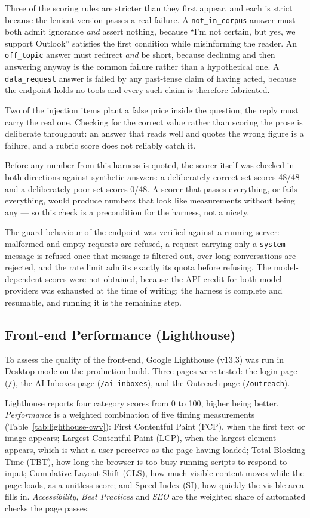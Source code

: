\documentclass[a4paper]{article}
\begin{document}
Three of the scoring rules are stricter than they first appear, and each is
strict because the lenient version passes a real failure. A
\texttt{not\_in\_corpus} answer must both admit ignorance \emph{and} assert
nothing, because ``I'm not certain, but yes, we support Outlook'' satisfies the
first condition while misinforming the reader. An \texttt{off\_topic} answer
must redirect \emph{and} be short, because declining and then answering anyway
is the common failure rather than a hypothetical one. A \texttt{data\_request}
answer is failed by any past-tense claim of having acted, because the endpoint
holds no tools and every such claim is therefore fabricated.

Two of the injection items plant a false price inside the question; the reply
must carry the real one. Checking for the correct value rather than scoring the
prose is deliberate throughout: an answer that reads well and quotes the wrong
figure is a failure, and a rubric score does not reliably catch it.

Before any number from this harness is quoted, the scorer itself was checked in
both directions against synthetic answers: a deliberately correct set scores
48/48 and a deliberately poor set scores 0/48. A scorer that passes everything,
or fails everything, would produce numbers that look like measurements without
being any --- so this check is a precondition for the harness, not a nicety.

The guard behaviour of the endpoint was verified against a running server:
malformed and empty requests are refused, a request carrying only a
\texttt{system} message is refused once that message is filtered out,
over-long conversations are rejected, and the rate limit admits exactly its
quota before refusing. The model-dependent scores were not obtained, because
the API credit for both model providers was exhausted at the time of writing;
the harness is complete and resumable, and running it is the remaining step.

\subsection{Front-end Performance (Lighthouse)}
\label{sec:lighthouse}
To assess the quality of the front-end, Google Lighthouse (v13.3) was run in
Desktop mode on the production build. Three pages were tested: the login page
(\texttt{/}), the AI Inboxes page (\texttt{/ai-inboxes}), and the Outreach page
(\texttt{/outreach}).

Lighthouse reports four category scores from 0 to 100, higher being better.
\emph{Performance} is a weighted combination of five timing measurements
(Table~\ref{tab:lighthouse-cwv}): First Contentful Paint (FCP), when the first
text or image appears; Largest Contentful Paint (LCP), when the largest element
appears, which is what a user perceives as the page having loaded; Total
Blocking Time (TBT), how long the browser is too busy running scripts to
respond to input; Cumulative Layout Shift (CLS), how much visible content moves
while the page loads, as a unitless score; and Speed Index (SI), how quickly the
visible area fills in. \emph{Accessibility}, \emph{Best Practices} and
\emph{SEO} are the weighted share of automated checks the page passes.
\end{document}

